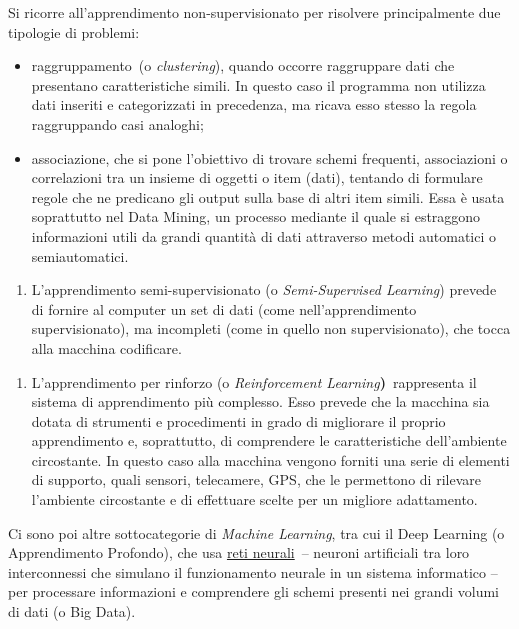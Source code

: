 {Si ricorre all'apprendimento non-supervisionato per risolvere
principalmente due tipologie di problemi:

\begin{itemize}
\item
  raggruppamento~(o \emph{clustering}), quando occorre raggruppare dati
  che presentano caratteristiche simili. In questo caso il programma non
  utilizza dati inseriti e categorizzati in precedenza, ma ricava esso
  stesso la regola raggruppando casi analoghi;
\item
  associazione, che si pone l'obiettivo di trovare schemi frequenti,
  associazioni o correlazioni tra un insieme di oggetti o item (dati),
  tentando di formulare regole che ne predicano gli output sulla base di
  altri item simili. Essa è usata soprattutto nel Data Mining, un
  processo mediante il quale si estraggono informazioni utili da grandi
  quantità di dati attraverso metodi automatici o semiautomatici.
\end{itemize}

\begin{enumerate}
\def\labelenumi{\arabic{enumi}.}
\setcounter{enumi}{2}
\item
  L'apprendimento semi-supervisionato (o \emph{Semi-Supervised
  Learning}) prevede di fornire al computer un set di dati (come
  nell'apprendimento supervisionato), ma incompleti (come in quello non
  supervisionato), che tocca alla macchina codificare.
\end{enumerate}

\begin{enumerate}
\def\labelenumi{\arabic{enumi}.}
\setcounter{enumi}{3}
\item
  L'apprendimento per rinforzo (o \emph{Reinforcement
  Learning}\textbf{)}~rappresenta il sistema di apprendimento più
  complesso. Esso prevede che la macchina sia dotata di strumenti e
  procedimenti in grado di migliorare il proprio apprendimento e,
  soprattutto, di comprendere le caratteristiche dell'ambiente
  circostante. In questo caso alla macchina vengono forniti una serie di
  elementi di supporto, quali sensori, telecamere, GPS, che le
  permettono di rilevare l'ambiente circostante e di effettuare scelte
  per un migliore adattamento.
\end{enumerate}

Ci sono poi altre sottocategorie di \emph{Machine Learning}, tra cui il
Deep Learning (o Apprendimento Profondo), che usa
\href{https://www.ai4business.it/intelligenza-artificiale/deep-learning/reti-neurali/}{reti
neurali}~-- neuroni artificiali tra loro interconnessi che simulano il
funzionamento neurale in un sistema informatico -- per processare
informazioni e comprendere gli schemi presenti nei grandi volumi di dati
(o Big Data).

}
